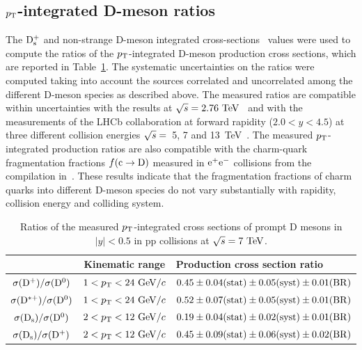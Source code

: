 \subsection{$p_{\rm T}$-integrated D-meson ratios}
\label{sec:ppDratiosPtint}
The ${\rm D_s^+}$ and non-strange D-meson integrated cross-sections~\cite{Acharya:2017jgo} values 
were used to compute the ratios of the $p_{\rm T}$-integrated D-meson 
production cross sections, which are reported in Table~\ref{tab:ptintegrat}.
The systematic uncertainties on the ratios were computed taking into
account the sources correlated and uncorrelated among the different D-meson
species as described above.
The measured ratios are compatible within uncertainties with the results at
$\sqrt{s}=2.76~\mathrm{TeV}$~\cite{Abelev:2012vra} and with the measurements of
the LHCb collaboration at forward rapidity ($2.0<y<4.5$) at three 
different collision energies $\sqrt{s}=$~5, 7 and 
13~TeV~\cite{Aaij:2013mga,Aaij:2016jht,Aaij:2015bpa}.
The measured $p_{\rm T}$-integrated production ratios are also compatible with the
charm-quark fragmentation fractions $f(\rm c\to D)$ measured in ${\rm e^+e^-}$ 
collisions from the compilation in~\cite{Gladilin:2014tba}.
These results indicate that the fragmentation fractions of charm quarks into
different D-meson species do not vary substantially with rapidity, collision
energy and colliding system.
\begin{table}[!h]
\centering
\begin{tabular}{c|c|l} 
 & Kinematic range & Production cross section ratio \\
\hline
\rule{0pt}{12pt} 
$\sigma({\rm D^+}) / \sigma({\rm D^0})$ & $1<p_{\rm T}<24~\mathrm{GeV}/c$ & $0.45 \pm 0.04 ({\rm stat}) \pm 0.05 ({\rm syst}) \pm 0.01 ({\rm BR})$\\[1ex]
$\sigma({\rm D^{*+}}) / \sigma({\rm D^0})$ & $1<p_{\rm T}<24~\mathrm{GeV}/c$ & $0.52 \pm 0.07 ({\rm stat}) \pm 0.05 ({\rm syst}) \pm 0.01 ({\rm BR})$\\[1ex]
$\sigma({\rm D_s}) / \sigma({\rm D^0})$    & $2<p_{\rm T}<12~\mathrm{GeV}/c$ & $0.19 \pm 0.04 ({\rm stat}) \pm 0.02 ({\rm syst}) \pm 0.01 ({\rm BR})$\\[1ex]
$\sigma({\rm D_s}) / \sigma({\rm D^+})$    & $2<p_{\rm T}<12~\mathrm{GeV}/c$ & $0.45 \pm 0.09 ({\rm stat}) \pm 0.06 ({\rm syst}) \pm 0.02 ({\rm BR})$\\[1ex]
\hline
\end{tabular}
\caption{Ratios of the measured $p_{\rm T}$-integrated cross sections of prompt D mesons in $|y| < 0.5$ in pp collisions at $\sqrt{s} = 7~\mathrm{TeV}$.}
\label{tab:ptintegrat}
\end{table}

